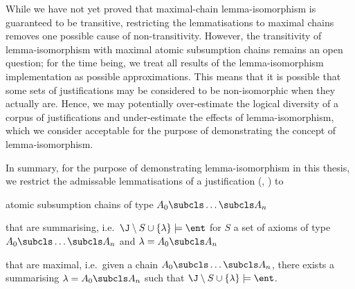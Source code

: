 While we have not yet proved that maximal-chain lemma-isomorphism is guaranteed to be transitive, restricting the lemmatisations to maximal chains removes one possible cause of non-transitivity. However, the transitivity of lemma-isomorphism with maximal atomic subsumption chains remains an open question; for the time being, we treat all results of the lemma-isomorphism implementation as possible approximations. This means that it is possible that some sets of justifications may be considered to be non-isomorphic when they actually are. Hence, we may potentially over-estimate the logical diversity of a corpus of justifications and under-estimate the effects of lemma-isomorphism, which we consider acceptable for the purpose of demonstrating the concept of lemma-isomorphism.



In summary, for the purpose of demonstrating lemma-isomorphism in this thesis, we restrict the admissable lemmatisations of a justification (\J, \ent) to 
\begin{compactitem}
\item atomic subsumption chains of type $A_{0} \subcls \ldots \subcls A_{n}$ 
\item that are summarising, i.e.\ $\J \setminus S \cup \{\lambda\} \models \ent$ for $S$ a set of axioms of type $A_{0} \subcls \ldots \subcls A_{n}$ and $\lambda = A_{0} \subcls A_{n}$
\item that are maximal, i.e.\ given a chain $A_{0} \subcls \ldots \subcls A_{n}$, there exists a summarising $\lambda = A_{0} \subcls A_{n}$ such that $\J \setminus S \cup \{\lambda\} \models \ent$.
\end{compactitem}

